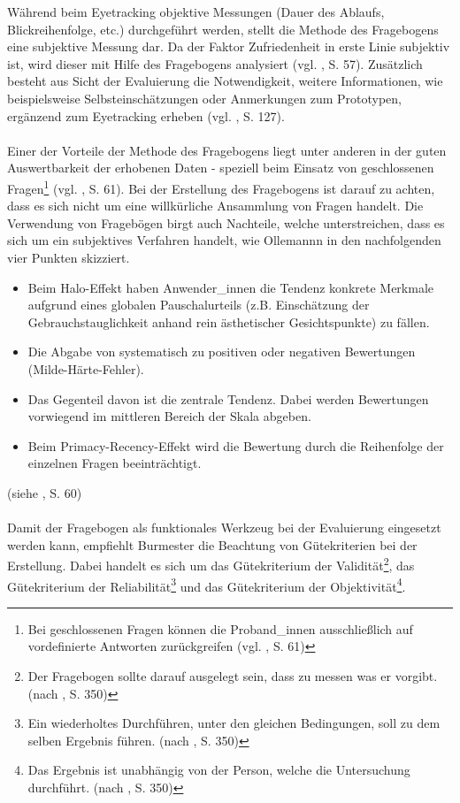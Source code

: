 \documentclass[Bachelorarbeit.tex]{subfiles}
\begin{document}
Während beim Eyetracking objektive Messungen  (Dauer des Ablaufs, Blickreihenfolge, etc.) durchgeführt werden, stellt die Methode des Fragebogens eine subjektive Messung dar.
Da der Faktor Zufriedenheit in erste Linie subjektiv ist, wird dieser mit Hilfe des Fragebogens analysiert (vgl. \cite{Ollermann2007}, S. 57).
Zusätzlich besteht aus Sicht der Evaluierung die Notwendigkeit, weitere Informationen, wie beispielsweise Selbsteinschätzungen oder Anmerkungen zum Prototypen, ergänzend zum Eyetracking erheben (vgl. \cite{Laugwitz2006}, S. 127). \\
\\
Einer der Vorteile der Methode des Fragebogens liegt unter anderen in der guten Auswertbarkeit der erhobenen Daten - speziell beim Einsatz von geschlossenen Fragen\footnote{Bei geschlossenen Fragen können die Proband\_innen ausschließlich auf vordefinierte Antworten zurückgreifen (vgl. \cite{Ollermann2007}, S. 61)} (vgl. \cite{Ollermann2007}, S. 61). 
Bei der Erstellung des Fragebogens ist darauf zu achten, dass es sich nicht  um eine willkürliche Ansammlung von Fragen handelt.
Die Verwendung von Fragebögen birgt auch Nachteile, welche unterstreichen, dass es sich um ein subjektives Verfahren handelt, wie Ollemannn in den nachfolgenden vier Punkten skizziert.
\begin{itemize}
	\item Beim Halo-Effekt haben Anwender\_innen die Tendenz konkrete Merkmale aufgrund  eines globalen Pauschalurteils (z.B. Einschätzung der Gebrauchstauglichkeit anhand rein ästhetischer Gesichtspunkte) zu fällen.
	\item Die Abgabe von systematisch zu positiven oder negativen Bewertungen (Milde-Härte-Fehler).
	\item Das Gegenteil davon ist die zentrale Tendenz. Dabei werden Bewertungen vorwiegend im mittleren Bereich der Skala abgeben.
	\item Beim Primacy-Recency-Effekt wird die Bewertung durch die Reihenfolge der einzelnen Fragen beeinträchtigt. 
\end{itemize}
(siehe \cite{Ollermann2007}, S. 60)\\
\\
Damit der Fragebogen als funktionales Werkzeug bei der Evaluierung eingesetzt werden kann, empfiehlt Burmester die Beachtung von Gütekriterien bei der Erstellung.
Dabei handelt es sich um das Gütekriterium der Validität\footnote{Der Fragebogen sollte darauf ausgelegt sein, dass zu messen was er vorgibt. (nach \cite{Burmester}, S. 350)}, das Gütekriterium der Reliabilität\footnote{Ein wiederholtes Durchführen, unter den gleichen Bedingungen, soll zu dem selben Ergebnis führen. (nach \cite{Burmester}, S. 350)} und das Gütekriterium der Objektivität\footnote{Das Ergebnis ist unabhängig von der Person, welche die Untersuchung durchführt. (nach \cite{Burmester}, S. 350)}. \\
\end{document}
